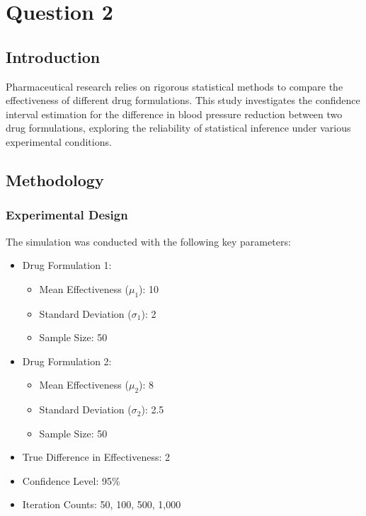\documentclass[12pt]{article}
\begin{document}
\section{Question 2}

\subsection{Introduction}
Pharmaceutical research relies on rigorous statistical methods to compare the effectiveness of different drug formulations. This study investigates the confidence interval estimation for the difference in blood pressure reduction between two drug formulations, exploring the reliability of statistical inference under various experimental conditions.

\subsection{Methodology}
\subsubsection{Experimental Design}
The simulation was conducted with the following key parameters:
\begin{itemize}
    \item Drug Formulation 1:
    \begin{itemize}
        \item Mean Effectiveness ($\mu_1$): 10
        \item Standard Deviation ($\sigma_1$): 2
        \item Sample Size: 50
    \end{itemize}
    
    \item Drug Formulation 2:
    \begin{itemize}
        \item Mean Effectiveness ($\mu_2$): 8
        \item Standard Deviation ($\sigma_2$): 2.5
        \item Sample Size: 50
    \end{itemize}
    
    \item True Difference in Effectiveness: 2
    \item Confidence Level: 95\%
    \item Iteration Counts: 50, 100, 500, 1,000
\end{itemize}
\end{document}

